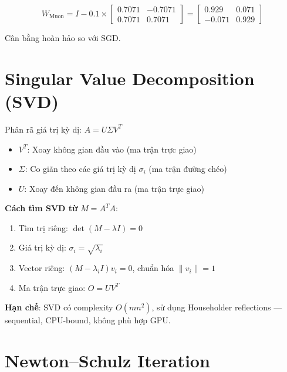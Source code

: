 \begin{equation}
    W_{\text{Muon}} = I - 0.1 \times \begin{bmatrix} 0.7071 & -0.7071 \\ 0.7071 & 0.7071 \end{bmatrix} = \begin{bmatrix} 0.929 & 0.071 \\ -0.071 & 0.929 \end{bmatrix}
\end{equation}

Cân bằng hoàn hảo so với SGD.

\section{Singular Value Decomposition (SVD)}

\begin{conceptbox}
Phân rã giá trị kỳ dị: $A = U \Sigma V^T$

\begin{itemize}
    \item $V^T$: Xoay không gian đầu vào (ma trận trực giao)
    \item $\Sigma$: Co giãn theo các giá trị kỳ dị $\sigma_i$ (ma trận đường chéo)
    \item $U$: Xoay đến không gian đầu ra (ma trận trực giao)
\end{itemize}
\end{conceptbox}

\textbf{Cách tìm SVD từ} $M = A^T A$:
\begin{enumerate}
    \item Tìm trị riêng: $\det(M - \lambda I) = 0$
    \item Giá trị kỳ dị: $\sigma_i = \sqrt{\lambda_i}$
    \item Vector riêng: $(M - \lambda_i I)v_i = 0$, chuẩn hóa $\|v_i\| = 1$
    \item Ma trận trực giao: $O = UV^T$
\end{enumerate}

\textbf{Hạn chế}: SVD có complexity $O(mn^2)$, sử dụng Householder reflections --- sequential, CPU-bound, không phù hợp GPU.

\section{Newton--Schulz Iteration}
\label{sec:newton_schulz}

